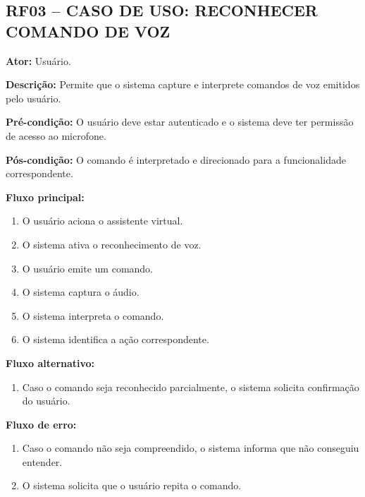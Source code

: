 \documentclass[12pt,oneside,a4paper,brazil,final]{abntex2}
\begin{document}
\clearpage
\subsection*{RF03 -- CASO DE USO: RECONHECER COMANDO DE VOZ}



\textbf{Ator:} Usuário.



\textbf{Descrição:} Permite que o sistema capture e interprete comandos de voz emitidos pelo usuário.



\textbf{Pré-condição:} O usuário deve estar autenticado e o sistema deve ter permissão de acesso ao microfone.



\textbf{Pós-condição:} O comando é interpretado e direcionado para a funcionalidade correspondente.



\textbf{Fluxo principal:}

\begin{enumerate}

    \item O usuário aciona o assistente virtual.

    \item O sistema ativa o reconhecimento de voz.

    \item O usuário emite um comando.

    \item O sistema captura o áudio.

    \item O sistema interpreta o comando.

    \item O sistema identifica a ação correspondente.

\end{enumerate}



\textbf{Fluxo alternativo:}

\begin{enumerate}

    \item Caso o comando seja reconhecido parcialmente, o sistema solicita confirmação do usuário.

\end{enumerate}



\textbf{Fluxo de erro:}

\begin{enumerate}

    \item Caso o comando não seja compreendido, o sistema informa que não conseguiu entender.

    \item O sistema solicita que o usuário repita o comando.

\end{enumerate}
\end{document}
